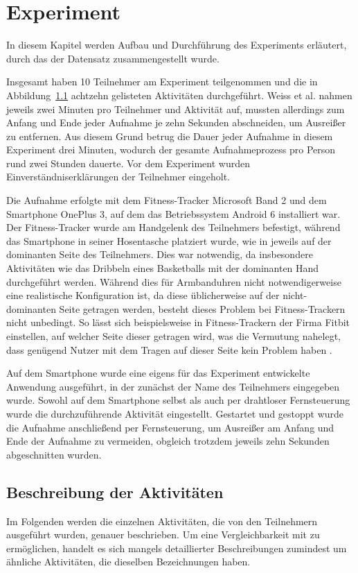 \chapter{Experiment}
\label{chap:experiment}
In diesem Kapitel werden Aufbau und Durchführung des Experiments erläutert, durch das der Datensatz zusammengestellt wurde.

Insgesamt haben 10 Teilnehmer am Experiment teilgenommen und die in Abbildung~\ref{sec:activities} achtzehn gelisteten Aktivitäten durchgeführt. Weiss et al. nahmen jeweils zwei Minuten pro Teilnehmer und Aktivität auf\cite{Weiss2016}, mussten allerdings zum Anfang und Ende jeder Aufnahme je zehn Sekunden abschneiden, um Ausreißer zu entfernen. Aus diesem Grund betrug die Dauer jeder Aufnahme in diesem Experiment drei Minuten, wodurch der gesamte Aufnahmeprozess pro Person rund zwei Stunden dauerte. Vor dem Experiment wurden Einverständniserklärungen der Teilnehmer eingeholt.

Die Aufnahme erfolgte mit dem Fitness-Tracker Microsoft Band 2 und dem Smartphone OnePlus 3, auf dem das Betriebssystem Android 6 installiert war. Der Fitness-Tracker wurde am Handgelenk des Teilnehmers befestigt, während das Smartphone in seiner Hosentasche platziert wurde, wie in \cite{Weiss2016} jeweils auf der dominanten Seite des Teilnehmers. Dies war notwendig, da insbesondere Aktivitäten wie das Dribbeln eines Basketballs mit der dominanten Hand durchgeführt werden. Während dies für Armbanduhren nicht notwendigerweise eine realistische Konfiguration ist, da diese üblicherweise auf der nicht-dominanten Seite getragen werden, besteht dieses Problem bei Fitness-Trackern nicht unbedingt. So lässt sich beispielsweise in Fitness-Trackern der Firma Fitbit einstellen, auf welcher Seite dieser getragen wird, was die Vermutung nahelegt, dass genügend Nutzer mit dem Tragen auf dieser Seite kein Problem haben \cite{FitbitHelpDominant}.

Auf dem Smartphone wurde eine eigens für das Experiment entwickelte Anwendung ausgeführt, in der zunächst der Name des Teilnehmers eingegeben wurde. Sowohl auf dem Smartphone selbst als auch per drahtloser Fernsteuerung wurde die durchzuführende Aktivität eingestellt. Gestartet und gestoppt wurde die Aufnahme anschließend per Fernsteuerung, um Ausreißer am Anfang und Ende der Aufnahme zu vermeiden, obgleich trotzdem jeweils zehn Sekunden abgeschnitten wurden.

\section{Beschreibung der Aktivitäten}
\label{sec:activities}
Im Folgenden werden die einzelnen Aktivitäten, die von den Teilnehmern ausgeführt wurden, genauer beschrieben. Um eine Vergleichbarkeit mit \cite{Weiss2016} zu ermöglichen, handelt es sich mangels detaillierter Beschreibungen zumindest um ähnliche Aktivitäten, die dieselben Bezeichnungen haben.

